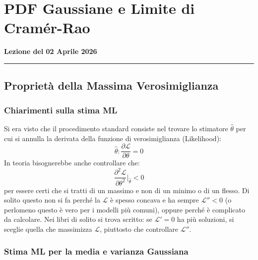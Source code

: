 \documentclass[openany,a4paper,12pt]{book}
\providecommand{\mathscr}[1]{\mathcal{#1}}
\theoremstyle{remark}
\newcommand{\thelezione}{}
\newcommand{\lezione}[2]{
\newpage
\renewcommand{\thelezione}{#2} 
\section{#1} 
\noindent\textbf{\color{RoyalBlue}Lezione del #2}\par\vspace{0.5em}\hrule\vspace{1em}
}
\begin{document}
\lezione{PDF Gaussiane e Limite di Cramér-Rao}{02 Aprile 2026}

\subsection*{Proprietà della Massima Verosimiglianza}

\subsubsection*{Chiarimenti sulla stima ML}

Si era visto che il procedimento standard consiste nel trovare lo stimatore $\hat{\theta}$ per cui si annulla la derivata della funzione di verosimiglianza (Likelihood):
\begin{equation}
    \hat{\theta} : \frac{\partial \mathscr{L}}{\partial \theta} = 0
\end{equation}
In teoria bisognerebbe anche controllare che:
\begin{equation}
    \frac{\partial^2 \mathscr{L}}{\partial \theta^2} \Bigg|_{\hat{\theta}} < 0
\end{equation}
per essere certi che si tratti di un massimo e non di un minimo o di un flesso.
Di solito questo non si fa perché la $\mathscr{L}$ è spesso concava e ha sempre $\mathscr{L}'' < 0$ (o perlomeno questo è vero per i modelli più comuni), oppure perché è complicato da calcolare. Nei libri di solito si trova scritto: se $\mathscr{L}' = 0$ ha più soluzioni, si sceglie quella che massimizza $\mathscr{L}$, piuttosto che controllare $\mathscr{L}''$.

\subsubsection{Stima ML per la media e varianza Gaussiana}
\end{document}
